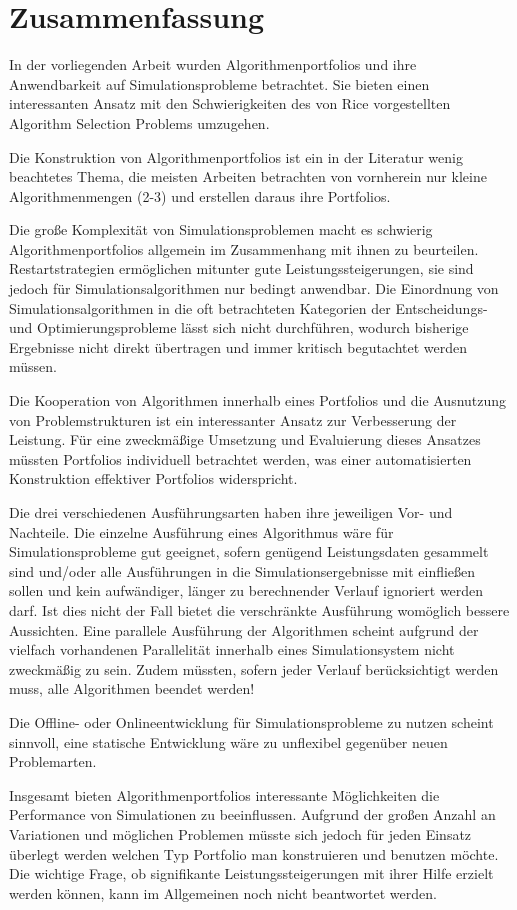 \chapter{Zusammenfassung}

In der vorliegenden Arbeit wurden Algorithmenportfolios und ihre Anwendbarkeit auf Simulationsprobleme betrachtet. Sie bieten einen interessanten Ansatz mit den Schwierigkeiten des von Rice vorgestellten Algorithm Selection Problems umzugehen. 

Die Konstruktion von Algorithmenportfolios ist ein in der Literatur wenig beachtetes Thema, die meisten Arbeiten betrachten von vornherein nur kleine Algorithmenmengen (2-3) und erstellen daraus ihre Portfolios.

Die große Komplexität von Simulationsproblemen macht es schwierig Algorithmenportfolios allgemein im Zusammenhang mit ihnen zu beurteilen. Restartstrategien ermöglichen mitunter gute Leistungssteigerungen, sie sind jedoch für Simulationsalgorithmen nur bedingt anwendbar. Die Einordnung von Simulationsalgorithmen in die oft betrachteten Kategorien der Entscheidungs- und Optimierungsprobleme lässt sich nicht durchführen, wodurch bisherige Ergebnisse nicht direkt übertragen und immer kritisch begutachtet werden müssen. 

Die Kooperation von Algorithmen innerhalb eines Portfolios und die Ausnutzung von Problemstrukturen ist ein interessanter Ansatz zur Verbesserung der Leistung. Für eine zweckmäßige Umsetzung und Evaluierung dieses Ansatzes müssten Portfolios individuell betrachtet werden, was einer automatisierten Konstruktion effektiver Portfolios widerspricht. 

Die drei verschiedenen Ausführungsarten haben ihre jeweiligen Vor- und Nachteile. Die einzelne Ausführung eines Algorithmus wäre für Simulationsprobleme gut geeignet, sofern genügend Leistungsdaten gesammelt sind und/oder alle Ausführungen in die Simulationsergebnisse mit einfließen sollen und kein aufwändiger, länger zu berechnender Verlauf ignoriert werden darf. Ist dies nicht der Fall bietet die verschränkte Ausführung womöglich bessere Aussichten. Eine parallele Ausführung der Algorithmen scheint aufgrund der vielfach vorhandenen Parallelität innerhalb eines Simulationsystem nicht zweckmäßig zu sein. Zudem müssten, sofern jeder Verlauf berücksichtigt werden muss, alle Algorithmen beendet werden!

Die Offline- oder Onlineentwicklung für Simulationsprobleme zu nutzen scheint sinnvoll, eine statische Entwicklung wäre zu unflexibel gegenüber neuen Problemarten.

Insgesamt bieten Algorithmenportfolios interessante Möglichkeiten die Performance von Simulationen zu beeinflussen. Aufgrund der großen Anzahl an Variationen und möglichen Problemen müsste sich jedoch für jeden Einsatz überlegt werden welchen Typ Portfolio man konstruieren und benutzen möchte. Die wichtige Frage, ob signifikante Leistungssteigerungen mit ihrer Hilfe erzielt werden können, kann im Allgemeinen noch nicht beantwortet werden.


